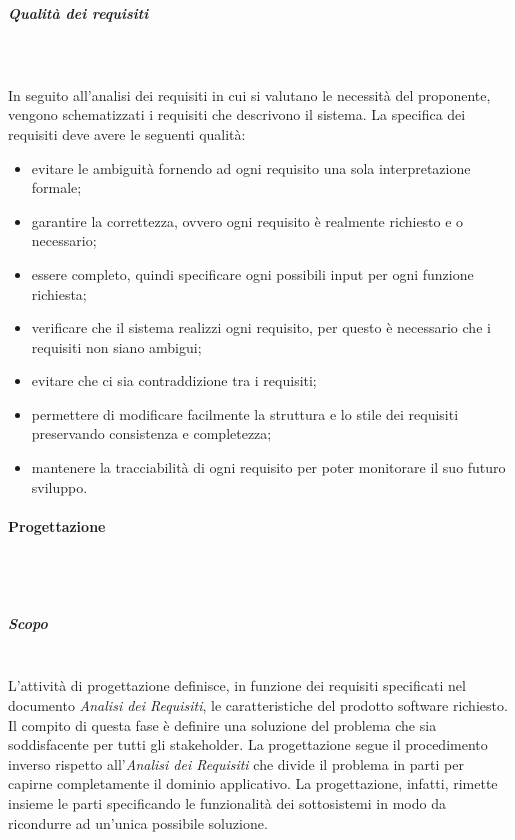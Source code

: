 			\subparagraph{Qualità dei requisiti} \mbox{}\\ \mbox{}\\
			In seguito all'analisi dei requisiti in cui si valutano le necessità del proponente,
			vengono schematizzati i requisiti che descrivono il sistema. 
			La specifica dei requisiti deve avere le seguenti qualità:
			\begin{itemize}
			\item evitare le ambiguità fornendo ad ogni requisito una sola interpretazione formale;
			\item garantire la correttezza, ovvero ogni requisito è realmente richiesto e o necessario;
 			\item essere completo, quindi specificare ogni possibili input per ogni funzione richiesta;
 			\item verificare che il sistema realizzi ogni requisito, per questo è necessario che i requisiti non siano
 			ambigui;
			\item evitare che ci sia contraddizione tra i requisiti;
 			\item permettere di modificare facilmente la struttura e lo stile dei requisiti preservando consistenza e completezza;
 			\item mantenere la tracciabilità di ogni requisito per poter monitorare il suo futuro sviluppo.
			\end{itemize}
					
		\paragraph{Progettazione} \mbox{}\\ \mbox{}\\
		\subparagraph{Scopo} \mbox{}\\
			
			\noindent L'attività di progettazione definisce, in funzione dei requisiti specificati 
			nel documento \textit{Analisi dei Requisiti}, le caratteristiche del prodotto 
			software richiesto. Il compito di questa fase è definire una soluzione del 
			problema che sia soddisfacente per tutti gli stakeholder. La progettazione segue 
			il procedimento inverso rispetto all'\textit{Analisi dei Requisiti} che divide 
			il problema in parti per capirne completamente il dominio applicativo. La 
			progettazione, infatti, rimette insieme le parti specificando le funzionalità 
			dei sottosistemi in modo da ricondurre ad un'unica possibile soluzione. \newline 
			
